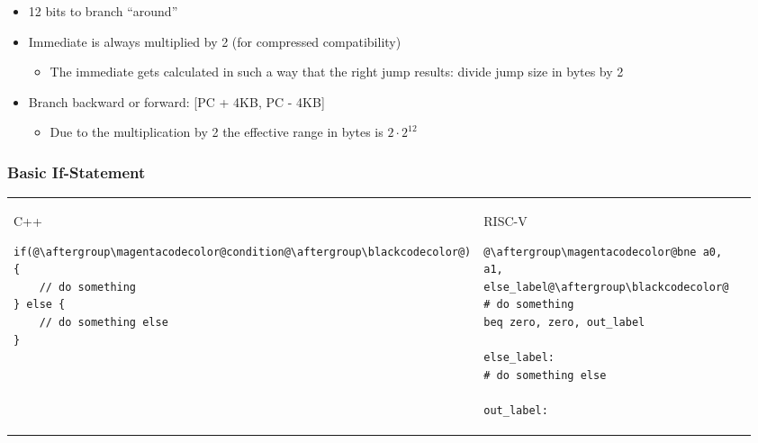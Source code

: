\begin{itemize}
    \item 12 bits to branch ``around''
    \item Immediate is always multiplied by 2 (for compressed compatibility)
          \begin{itemize}
              \item The immediate gets calculated in such a way that the right jump results: divide jump size in bytes by 2
          \end{itemize}
    \item Branch backward or forward: [PC + 4KB, PC - 4KB]
          \begin{itemize}
              \item Due to the multiplication by 2 the effective range in bytes is $2\cdot {2}^{12}$
          \end{itemize}
\end{itemize}

\subsubsection{Basic If-Statement}

\setlength{\oldtabcolsep}{\tabcolsep}\setlength\tabcolsep{2pt}
\begin{tabular}[width=\linewidth]{p{0.48\linewidth} p{0.48\linewidth}}
    C++
    \begin{lstlisting}[escapechar=@]
if(@\aftergroup\magentacodecolor@condition@\aftergroup\blackcodecolor@){
    // do something
} else {
    // do something else
}\end{lstlisting}
     &
    RISC-V
    \begin{lstlisting}[escapechar=@]
@\aftergroup\magentacodecolor@bne a0, a1, else_label@\aftergroup\blackcodecolor@
# do something
beq zero, zero, out_label

else_label:
# do something else

out_label:
\end{lstlisting}
\end{tabular}
\setlength{\tabcolsep}{\oldtabcolsep}

